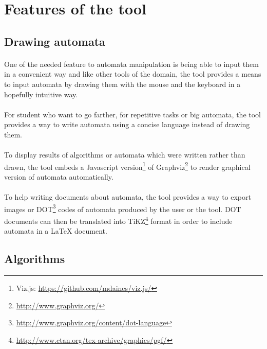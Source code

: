 \section{Features of the tool}
\subsection{Drawing automata}


\paragraph{}
One of the needed feature to automata manipulation is being able to input them in a convenient way and like other tools of the domain, the tool provides a means to input automata by drawing them with the mouse and the keyboard in a hopefully intuitive way.


\paragraph{}
For student who want to go farther, for repetitive tasks or big automata, the tool provides a way to write automata using a concise language instead of drawing them.


\paragraph{}
To display results of algorithms or automata which were written rather than drawn, the tool embeds a Javascript version\footnote{Viz.js: \href{https://github.com/mdaines/viz.js/}{https://github.com/mdaines/viz.js/}} of Graphviz\footnote{\href{http://www.graphviz.org/}{http://www.graphviz.org/}} to render graphical version of automata automatically.


\paragraph{}
To help writing documents about automata, the tool provides a way to export images or DOT\footnote{\href{http://www.graphviz.org/content/dot-language}{http://www.graphviz.org/content/dot-language}} codes of automata produced by the user or the tool. DOT documents can then be translated into TiKZ\footnote{\href{http://www.ctan.org/tex-archive/graphics/pgf/}{http://www.ctan.org/tex-archive/graphics/pgf/}} format in order to include automata in a LaTeX document.




\subsection{Algorithms}


